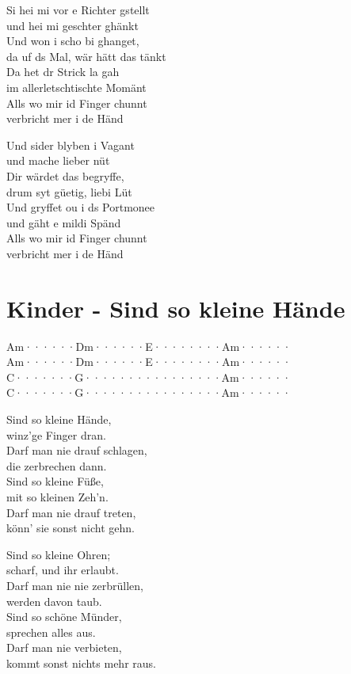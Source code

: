 \documentclass[
  letterpaper,
  twoside=false]{scrbook}
\begin{document}
Si hei mi vor e Richter gstellt\\
und hei mi geschter ghänkt\\
Und won i scho bi ghanget,\\
da uf ds Mal, wär hätt das tänkt\\
Da het dr Strick la gah\\
im allerletschtischte Momänt\\
Alls wo mir id Finger chunnt\\
verbricht mer i de Händ

Und sider blyben i Vagant\\
und mache lieber nüt\\
Dir wärdet das begryffe,\\
drum syt güetig, liebi Lüt\\
Und gryffet ou i ds Portmonee\\
und gäht e mildi Spänd\\
Alls wo mir id Finger chunnt\\
verbricht mer i de Händ

\hypertarget{kinder---sind-so-kleine-huxe4nde}{%
\chapter{Kinder - Sind so kleine
Hände}\label{kinder---sind-so-kleine-huxe4nde}}

Am······\textbar Dm······\textbar E········\textbar Am······\textbar{}\\
Am······\textbar Dm······\textbar E········\textbar Am······\textbar{}\\
C·······\textbar G·······\textbar·········\textbar Am······\textbar{}\\
C·······\textbar G·······\textbar·········\textbar Am······\textbar{}

Sind so kleine Hände,\\
winz'ge Finger dran.\\
Darf man nie drauf schlagen,\\
die zerbrechen dann.\\
Sind so kleine Füße,\\
mit so kleinen Zeh'n.\\
Darf man nie drauf treten,\\
könn' sie sonst nicht gehn.

Sind so kleine Ohren;\\
scharf, und ihr erlaubt.\\
Darf man nie nie zerbrüllen,\\
werden davon taub.\\
Sind so schöne Münder,\\
sprechen alles aus.\\
Darf man nie verbieten,\\
kommt sonst nichts mehr raus.
\end{document}
